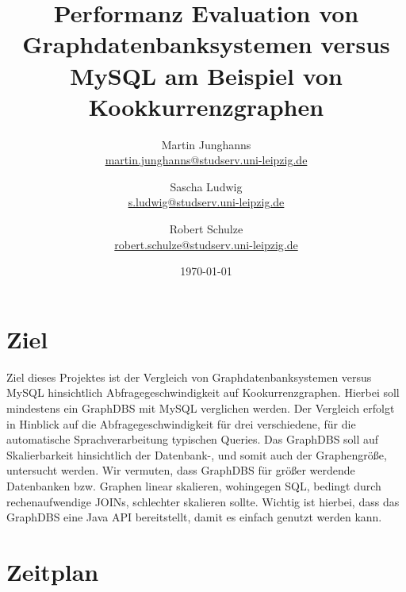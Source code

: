 \documentclass[11pt, a4paper, oneside]{article} %
\author{Martin Junghanns \\  \url{martin.junghanns@studserv.uni-leipzig.de} \and 
		Sascha Ludwig \\ \url{s.ludwig@studserv.uni-leipzig.de} \and 
		Robert Schulze \\ \url{robert.schulze@studserv.uni-leipzig.de} }
\date{\today}
\title{Performanz Evaluation von Graphdatenbanksystemen versus MySQL am Beispiel von Kookkurrenzgraphen }
\begin{document}
\renewcommand{\labelitemi}{-}

\maketitle


\section{Ziel}

Ziel dieses Projektes ist der Vergleich von Graphdatenbanksystemen versus MySQL hinsichtlich Abfragegeschwindigkeit auf Kookurrenzgraphen. Hierbei soll mindestens ein GraphDBS mit MySQL verglichen werden. Der Vergleich erfolgt in Hinblick auf die Abfragegeschwindigkeit für drei verschiedene, für die automatische Sprachverarbeitung typischen Queries. Das GraphDBS soll auf Skalierbarkeit hinsichtlich der Datenbank-, und somit auch der Graphengröße, untersucht werden. Wir vermuten, dass GraphDBS für größer werdende Datenbanken bzw. Graphen linear skalieren, wohingegen SQL, bedingt durch rechenaufwendige JOINs, schlechter skalieren sollte. Wichtig ist hierbei, dass das GraphDBS eine Java API bereitstellt, damit es einfach genutzt werden kann. 

\section{Zeitplan}

\setlength{\tabcolsep}{10pt}		%
\renewcommand{\arraystretch}{1.5}	%
\end{document}
